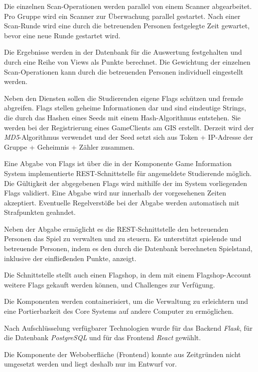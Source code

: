 Die einzelnen Scan-Operationen werden parallel von einem Scanner abgearbeitet. Pro Gruppe wird ein Scanner zur Überwachung parallel gestartet. Nach einer Scan-Runde wird eine durch die betreuenden Personen festgelegte Zeit gewartet, bevor eine neue Runde gestartet wird.

Die Ergebnisse werden in der Datenbank für die Auswertung festgehalten und durch eine Reihe von Views als Punkte berechnet. Die Gewichtung der einzelnen Scan-Operationen kann durch die betreuenden Personen individuell eingestellt werden.

Neben den Diensten sollen die Studierenden eigene Flags schützen und fremde abgreifen.
Flags stellen geheime Informationen dar und sind eindeutige Strings, die durch das Hashen eines Seeds mit einem Hash-Algorithmus entstehen. Sie werden bei der Registrierung eines GameClients am GIS erstellt.
Derzeit wird der \textit{MD5}-Algorithmus verwendet und der Seed setzt sich aus Token + IP-Adresse der Gruppe + Geheimnis + Zähler zusammen.

Eine Abgabe von Flags ist über die in der Komponente Game Information System implementierte REST-Schnittstelle für angemeldete Studierende möglich. Die Gültigkeit der abgegebenen Flags wird mithilfe der im System vorliegenden Flags validiert. Eine Abgabe wird nur innerhalb der vorgesehenen Zeiten akzeptiert. Eventuelle Regelverstöße bei der Abgabe werden automatisch mit Strafpunkten geahndet.

Neben der Abgabe ermöglicht es die REST-Schnittstelle den betreuenden Personen das Spiel zu verwalten und zu steuern. Es unterstützt spielende und betreuende Personen, indem es den durch die Datenbank berechneten Spielstand, inklusive der einfließenden Punkte, anzeigt.

Die Schnittstelle stellt auch einen Flagshop, in dem mit einem Flagshop-Account weitere Flags gekauft werden können, und Challenges zur Verfügung.

Die Komponenten werden containerisiert, um die Verwaltung zu erleichtern und eine \linebreak Portierbarkeit des Core Systems auf andere Computer zu ermöglichen.

Nach Aufschlüsselung verfügbarer Technologien wurde für das Backend \textit{Flask}, für die \linebreak Datenbank \textit{PostgreSQL} und für das Frontend \textit{React} gewählt.

Die Komponente der Weboberfläche (Frontend) konnte aus Zeitgründen nicht umgesetzt \linebreak werden und liegt deshalb nur im Entwurf vor.




